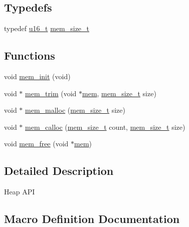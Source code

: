 \subsection*{Typedefs}
\begin{DoxyCompactItemize}
\item 
typedef \hyperlink{group__compiler__abstraction_ga77570ac4fcab86864fa1916e55676da2}{u16\+\_\+t} \hyperlink{openmote-cc2538_2lwip_2src_2include_2lwip_2mem_8h_a49bff6e5dd4cb95fe6dc0670962bbf54}{mem\+\_\+size\+\_\+t}
\end{DoxyCompactItemize}
\subsection*{Functions}
\begin{DoxyCompactItemize}
\item 
void \hyperlink{openmote-cc2538_2lwip_2src_2include_2lwip_2mem_8h_a44a136e3b70c36abb6f8dc060c778113}{mem\+\_\+init} (void)
\item 
void $\ast$ \hyperlink{openmote-cc2538_2lwip_2src_2include_2lwip_2mem_8h_a5e39a108c44d8a72df0b30a117cb62e4}{mem\+\_\+trim} (void $\ast$\hyperlink{structmem}{mem}, \hyperlink{native_2lwip_2src_2include_2lwip_2mem_8h_a49bff6e5dd4cb95fe6dc0670962bbf54}{mem\+\_\+size\+\_\+t} size)
\item 
void $\ast$ \hyperlink{openmote-cc2538_2lwip_2src_2include_2lwip_2mem_8h_a932aa40d85b14cb7331625e012d12335}{mem\+\_\+malloc} (\hyperlink{native_2lwip_2src_2include_2lwip_2mem_8h_a49bff6e5dd4cb95fe6dc0670962bbf54}{mem\+\_\+size\+\_\+t} size)
\item 
void $\ast$ \hyperlink{openmote-cc2538_2lwip_2src_2include_2lwip_2mem_8h_ab0bdc525971701883f2065e7fb257a24}{mem\+\_\+calloc} (\hyperlink{native_2lwip_2src_2include_2lwip_2mem_8h_a49bff6e5dd4cb95fe6dc0670962bbf54}{mem\+\_\+size\+\_\+t} count, \hyperlink{native_2lwip_2src_2include_2lwip_2mem_8h_a49bff6e5dd4cb95fe6dc0670962bbf54}{mem\+\_\+size\+\_\+t} size)
\item 
void \hyperlink{openmote-cc2538_2lwip_2src_2include_2lwip_2mem_8h_a2fd7aa1adf6e394d3be7c7734e7df41a}{mem\+\_\+free} (void $\ast$\hyperlink{structmem}{mem})
\end{DoxyCompactItemize}


\subsection{Detailed Description}
Heap A\+PI 

\subsection{Macro Definition Documentation}
\mbox{\label{openmote-cc2538_2lwip_2src_2include_2lwip_2mem_8h_a2cf923436027f37ef24b3abd898120a7}} 
